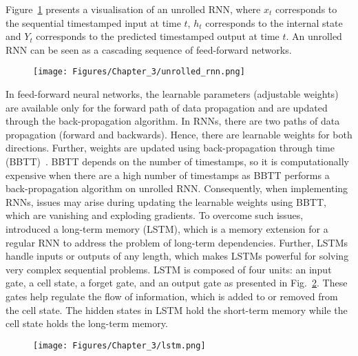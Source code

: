 Figure~\ref{unrolled_rnn} presents a visualisation of an unrolled RNN, where \(x_{t}\) corresponds to the sequential timestamped input at time \(t\), \(h_{t}\) corresponds to the internal state and \(Y_{t}\) corresponds to the predicted timestamped output at time \(t\).
An unrolled RNN can be seen as a cascading sequence of feed-forward networks.
\begin{figure}
	\begin{center}
	\texttt{[image: Figures/Chapter\_3/unrolled\_rnn.png]}
	\end{center}
	\label{unrolled_rnn}
\end{figure}

In feed-forward neural networks, the learnable parameters (adjustable weights) are available only for the forward path of data propagation and are updated through the back-propagation algorithm.
In RNNs, there are two paths of data propagation (forward and backwards).
Hence, there are learnable weights for both directions.
Further, weights are updated using back-propagation through time (BBTT)~\cite{Werbos1990}.
BBTT depends on the number of timestamps, so it is computationally expensive when there are a high number of timestamps as BBTT performs a back-propagation algorithm on unrolled RNN.
Consequently, when implementing RNNs, issues may arise during updating the learnable weights using BBTT, which are vanishing and exploding gradien\-ts.
To overcome such issues,~\textcite{Hochreiter1997} introduced a long-term memory (LSTM), which is a memory extension for a regular RNN to address the problem of long-term dependencies.
Further, LSTMs handle inputs or outputs of any length, which makes LSTMs powerful for solving very complex sequential problems.
LSTM is composed of four units: an input gate, a cell state, a forget gate, and an output gate as presented in Fig.~\ref{fig:lstm}.
These gates help regulate the flow of information, which is added to or removed from the cell state. 
The hidden states in LSTM hold the short-term memory while the cell state holds the long-term memory.
\begin{figure}[h!]
	\begin{center}
		\texttt{[image: Figures/Chapter\_3/lstm.png]}
	\end{center}
	\label{fig:lstm}
\end{figure}

